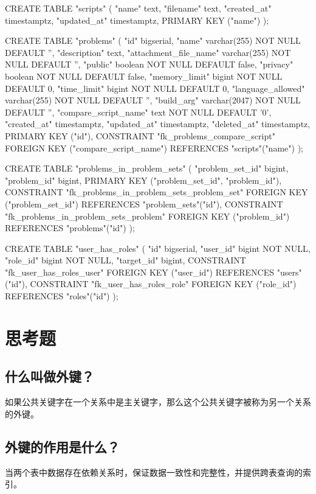 \documentclass{ctexrep}
\begin{document}
\begin{run}
    CREATE TABLE "scripts" (
        "name" text,
        "filename" text,
        "created_at" timestamptz,
        "updated_at" timestamptz,
        PRIMARY KEY ("name")
    );
    
    CREATE TABLE "problems" (
        "id" bigserial,
        "name" varchar(255) NOT NULL DEFAULT '',
        "description" text,
        "attachment_file_name" varchar(255) NOT NULL DEFAULT '',
        "public" boolean NOT NULL DEFAULT false,
        "privacy" boolean NOT NULL DEFAULT false,
        "memory_limit" bigint NOT NULL DEFAULT 0,
        "time_limit" bigint NOT NULL DEFAULT 0,
        "language_allowed" varchar(255) NOT NULL DEFAULT '',
        "build_arg" varchar(2047) NOT NULL DEFAULT '',
        "compare_script_name" text NOT NULL DEFAULT '0',
        "created_at" timestamptz,
        "updated_at" timestamptz,
        "deleted_at" timestamptz,
        PRIMARY KEY ("id"),
        CONSTRAINT "fk_problems_compare_script" FOREIGN KEY ("compare_script_name") REFERENCES "scripts"("name")
    );

    CREATE TABLE "problems_in_problem_sets" (
        "problem_set_id" bigint,
        "problem_id" bigint,
        PRIMARY KEY ("problem_set_id",
        "problem_id"),
        CONSTRAINT "fk_problems_in_problem_sets_problem_set" FOREIGN KEY ("problem_set_id") REFERENCES "problem_sets"("id"),
        CONSTRAINT "fk_problems_in_problem_sets_problem" FOREIGN KEY ("problem_id") REFERENCES "problems"("id")
    );

    CREATE TABLE "user_has_roles" (
        "id" bigserial,
        "user_id" bigint NOT NULL,
        "role_id" bigint NOT NULL,
        "target_id" bigint,
        CONSTRAINT "fk_user_has_roles_user" FOREIGN KEY ("user_id") REFERENCES "users"("id"),
        CONSTRAINT "fk_user_has_roles_role" FOREIGN KEY ("role_id") REFERENCES "roles"("id")
    );
    
\end{run}

\section{思考题}
\subsection*{什么叫做外键？}
如果公共关键字在一个关系中是主关键字，那么这个公共关键字被称为另一个关系的外键。
\subsection*{外键的作用是什么？}
当两个表中数据存在依赖关系时，保证数据一致性和完整性，并提供跨表查询的索引。
\end{document}
